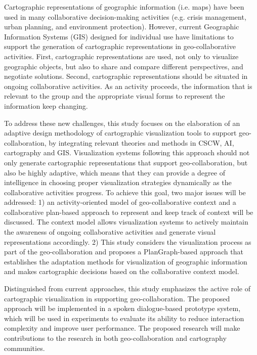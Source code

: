 Cartographic representations of geographic information (i.e. maps) have been used in many collaborative decision-making activities (e.g. crisis management, urban planning, and environment protection). However, current Geographic Information Systems (GIS) designed for individual use have limitations to support the generation of cartographic representations in geo-collaborative activities. First, cartographic representations are used, not only to visualize geographic objects, but also to share and compare different perspectives, and negotiate solutions. Second, cartographic representations should be situated in ongoing collaborative activities. As an activity proceeds, the information that is relevant to the group and the appropriate visual forms to represent the information keep changing. 

To address these new challenges, this study focuses on the elaboration of an adaptive design methodology of cartographic visualization tools to support geo-collaboration, by integrating relevant theories and methods in CSCW, AI, cartography and GIS. Visualization systems following this approach should not only generate cartographic representations that support geo-collaboration, but also be highly adaptive, which means that they can provide a degree of intelligence in choosing proper visualization strategies dynamically as the collaborative activities progress. To achieve this goal, two major issues will be addressed: 1) an activity-oriented model of geo-collaborative context and a collaborative plan-based approach to represent and keep track of context will be discussed. The context model allows visualization systems to actively maintain the awareness of ongoing collaborative activities and generate visual representations accordingly. 2) This study considers the visualization process as part of the geo-collaboration and proposes a PlanGraph-based approach that establishes the adaptation methods for visualization of geographic information and makes cartographic decisions based on the collaborative context model. 

Distinguished from current approaches, this study emphasizes the active role of cartographic visualization in supporting geo-collaboration. The proposed approach will be implemented in a spoken dialogue-based prototype system, which will be used in experiments to evaluate its ability to reduce interaction complexity and improve user performance. The proposed research will make contributions to the research in both geo-collaboration and cartography communities.
